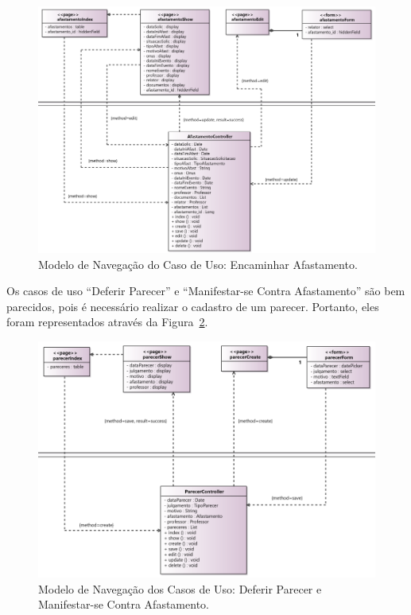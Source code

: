 \begin{figure}[h]
	\centering
	\includegraphics[width=1\textwidth]{figuras/figura-arquitetura-encaminharAfastamento.png}
	\caption{Modelo de Navegação do Caso de Uso: Encaminhar Afastamento.}
	\label{figura-arquitetura-encaminharAfastamento}
\end{figure}

Os casos de uso ``Deferir Parecer'' e ``Manifestar-se Contra Afastamento'' são bem parecidos, pois é necessário realizar o cadastro de um parecer. Portanto, eles foram representados através da Figura~\ref{figura-arquitetura-defParecer_manifContra}. 

\begin{figure}[h]
	\centering
	\includegraphics[width=1\textwidth]{figuras/figura-arquitetura-defParecer_manifContra.png}
	\caption{Modelo de Navegação dos Casos de Uso: Deferir Parecer e Manifestar-se Contra Afastamento.}
	\label{figura-arquitetura-defParecer_manifContra}
\end{figure}

